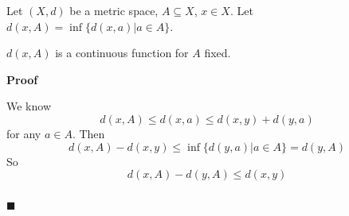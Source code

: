 \documentclass[main.tex]{subfiles}
\begin{document}
\begin{definition}
    Let $(X, d)$ be a metric space, $A \subseteq X$, $x\in X$. Let $d(x, A) = \inf \{d(x, a)| a\in A\}$.
\end{definition}
\begin{property}
    $d(x, A)$ is a continuous function for $A$ fixed. 
\end{property}
\par \noindent \textbf{Proof} 
\par We know 
\begin{equation}
    d(x, A) \le d(x, a) \le d(x, y) + d(y, a)
\end{equation}
for any $a\in A$. 
Then 
\begin{equation}
    d(x, A) - d(x, y) \le \inf \{d(y, a)| a\in A\} = d(y, A)
\end{equation}
So 
\begin{equation}
    d(x, A) - d(y, A) \le d(x, y) 
\end{equation}
\mbox{} \\ \null \hfill $\blacksquare$ 
\end{document}
